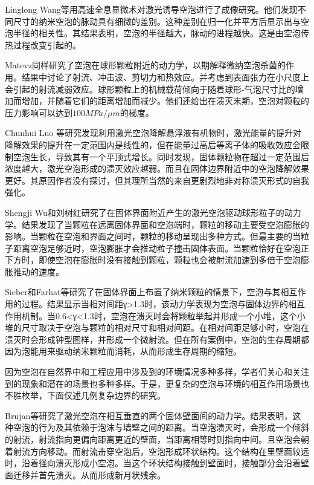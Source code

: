 Linglong Wang等用高速全息显微术对激光诱导空泡进行了成像研究\cite{wang_measurement_2021}。他们发现不同尺寸的纳米空泡的脉动具有细微的差别。这种差别在归一化并平方后显示出与空泡半径的相关性。其结果表明，空泡的半径越大，脉动的进程越快。这是由空泡传热过程改变引起的。

Matevz同样研究了空泡在球形颗粒附近的动力学，以期解释微纳空泡杀菌的作用\cite{zevnik_cavitation_2022,zevnik_cavitation_2020}。结果中讨论了射流、冲击波、剪切力和热效应。并考虑到表面张力在小尺度上会引起的射流减弱效应。球形颗粒上的机械载荷倾向于随着球形-气泡尺寸比的增加而增加，并随着它们的距离增加而减少。他们还给出在溃灭末期，空泡对颗粒的压力影响可以达到$100 MPa /\mu m$的梯度。

Chunhui Luo  等研究发现利用激光空泡降解悬浮液有机物时，激光能量的提升对降解效果的提升在一定范围内是线性的，但在能量过高后等离子体的吸收效应会限制空泡生长，导致其有一个平顶式增长。同时发现，固体颗粒物在超过一定范围后浓度越大，激光空泡形成的溃灭效应越弱\cite{luo_impact_2021}。而且在固体边界附近中的空泡降解效果更好。其原因作者没有探讨，但其理所当然的来自更剧烈地非对称溃灭形式的自我强化。

Shengji Wu和刘树红研究了在固体界面附近产生的激光空泡驱动球形粒子的动力学\cite{wu_dynamics_2021}。结果发现了当颗粒在远离固体界面和空泡端时，颗粒的移动主要受空泡膨胀的影响。当颗粒在空泡和界面之间时，颗粒的移动呈现出多种方式。但最主要的当粒子距离空泡足够近时，空泡膨胀才会推动粒子撞击固体表面。当颗粒恰好在空泡正下方时，即使空泡在膨胀时没有接触到颗粒，颗粒也会被射流加速到多倍于空泡膨胀推动的速度。

Sieber和Farhat等研究了在固体界面上布置了纳米颗粒的情景下，空泡与其相互作用的过程\cite{sieber_dynamics_2022}。结果显示当相对间距γ>1.3时，该动力学表现为空泡与固体边界的相互作用机制。当0.6<γ<1.3时，空泡在溃灭时会将颗粒举起并形成一个小堆，这个小堆的尺寸取决于空泡与颗粒的相对尺寸和相对间距。在相对间距足够小时，空泡在溃灭时会形成钟型图样，并形成一个微射流。但在所有案例中，空泡的生存周期都因为泡能用来驱动纳米颗粒而消耗，从而形成生存周期的缩短。

因为空泡在自然界中和工程应用中涉及到的环境情况多种多样，学者们关心和关注到的现象和潜在的场景也多种多样。于是，更复杂的空泡与环境的相互作用场景也不胜枚举，下面仅述几例复杂边界的研究。

Brujan等研究了激光空泡在相互垂直的两个固体壁面间的动力学。结果表明，这种空泡的行为及其依赖于泡沫与墙壁之间的距离\cite{brujan_dynamics_2018}。当空泡溃灭时，会形成一个倾斜的射流，射流指向更偏向距离更近的壁面，当距离相等时则指向中间。且空泡会朝着射流方向移动。而射流击穿空泡后，空泡形成环状结构。这个结构在里壁面较远时，沿着径向溃灭形成小空泡。当这个环状结构接触到壁面时，接触部分会沿着壁面迁移并首先溃灭。从而形成新月状残余。

